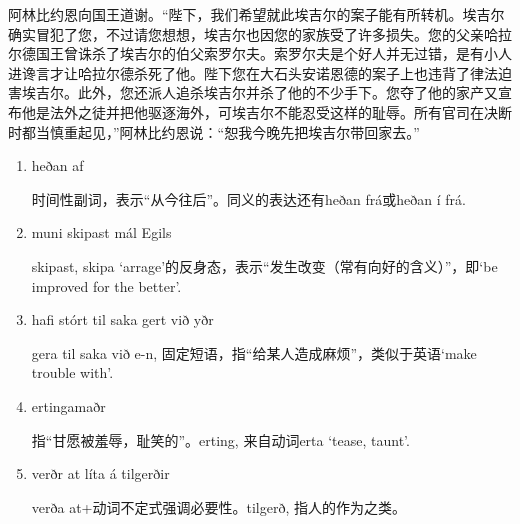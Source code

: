 \begin{translation*}{}
    阿林比约恩向国王道谢。“陛下，我们希望就此埃吉尔的案子能有所转机。埃吉尔确实冒犯了您，不过请您想想，埃吉尔也因您的家族受了许多损失。您的父亲哈拉尔德国王曾诛杀了埃吉尔的伯父索罗尔夫。索罗尔夫是个好人并无过错，是有小人进谗言才让哈拉尔德杀死了他。陛下您在大石头安诺恩德的案子上也违背了律法迫害埃吉尔。此外，您还派人追杀埃吉尔并杀了他的不少手下。您夺了他的家产又宣布他是法外之徒并把他驱逐海外，可埃吉尔不能忍受这样的耻辱。所有官司在决断时都当慎重起见，”阿林比约恩说：“恕我今晚先把埃吉尔带回家去。”
\end{translation*}
\begin{grammar*}{}
    \begin{enumerate}[leftmargin=*]
        \item heðan af

              时间性副词，表示“从今往后”。同义的表达还有heðan frá或heðan í frá.

        \item muni skipast mál Egils

              skipast, skipa `arrage'的反身态，表示“发生改变（常有向好的含义）”，即`be improved for the better'.

        \item hafi stórt til saka gert við yðr

              gera til saka við e-n, 固定短语，指“给某人造成麻烦”，类似于英语`make trouble with'.

        \item ertingamaðr

              指“甘愿被羞辱，耻笑的”。erting, 来自动词erta `tease, taunt'.

        \item verðr at líta á tilgerðir

              verða at+动词不定式强调必要性。tilgerð, 指人的作为之类。
    \end{enumerate}
\end{grammar*}

